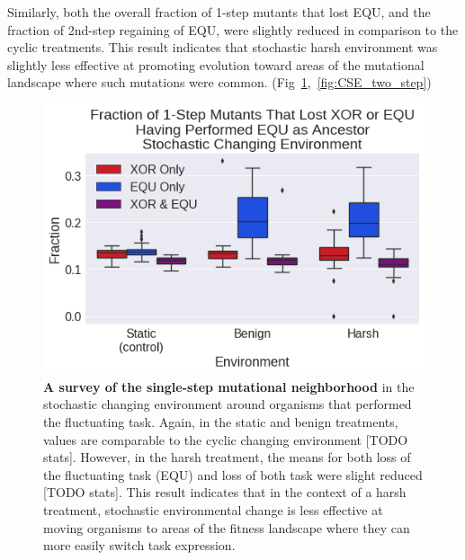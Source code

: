 \documentclass[PhD]{msu-thesis}
\begin{document}
Similarly, both the overall fraction of 1-step mutants that lost EQU, and the fraction of 2nd-step regaining of EQU, were slightly reduced in comparison to the cyclic treatments. This result indicates that stochastic harsh environment was slightly less effective at promoting evolution toward areas of the mutational landscape where such mutations were common.
(Fig~\ref{fig:CSE_single_step},~\ref{fig:CSE_two_step})

	\begin{figure}[!h] %
	\includegraphics[trim={0.2cm 0 0 0.2cm},clip,width=0.75\columnwidth]{figures/CE/CSE_frac_1step__filtered__box.png}
	\caption{\textbf{A survey of the single-step mutational neighborhood} in the stochastic changing environment around organisms that performed the fluctuating task. Again, in the static and benign treatments, values are comparable to the cyclic changing environment [TODO stats]. However, in the harsh treatment, the means for both loss of the fluctuating task (EQU) and loss of both task were slight reduced [TODO stats]. This result indicates that in the context of a harsh treatment, stochastic environmental change is less effective at moving organisms to areas of the fitness landscape where they can more easily switch task expression.%
	}\label{fig:CSE_single_step}
	\end{figure}
\end{document}
